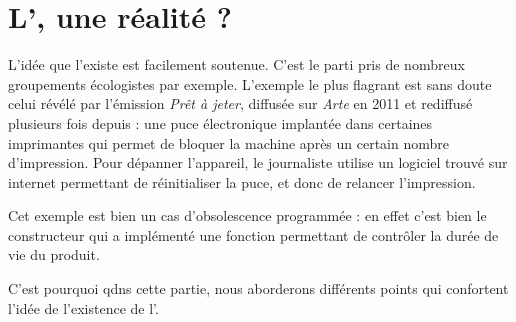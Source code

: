 \section{L'\op, une réalité ?}

L'idée que l'\op existe est facilement soutenue. C'est le parti pris de nombreux groupements écologistes par exemple.
\smallbreak
L'exemple le plus flagrant est sans doute celui révélé par l'émission  \textit{Prêt à jeter}, diffusée sur \textit{Arte} en 2011 et rediffusé plusieurs fois depuis : une puce électronique implantée dans certaines imprimantes qui permet de bloquer la machine après un certain nombre d'impression. Pour dépanner l'appareil, le journaliste utilise un logiciel trouvé sur internet permettant de réinitialiser la puce, et donc de relancer l'impression. 

Cet exemple est bien un cas d'obsolescence programmée : en effet c'est bien le constructeur qui a implémenté une fonction permettant de contrôler la durée de vie du produit. 

C'est pourquoi qdns cette partie, nous aborderons différents points qui confortent l'idée de l’existence de l'\op.
